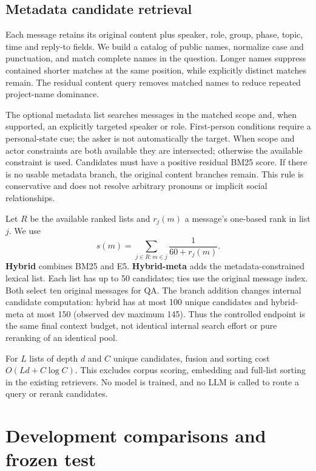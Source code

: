 \documentclass[10pt,a4paper]{article}
\begin{document}
\subsection{Metadata candidate retrieval}
Each message retains its original content plus speaker, role, group, phase, topic, time and reply-to fields. We build a catalog of public names, normalize case and punctuation, and match complete names in the question. Longer names suppress contained shorter matches at the same position, while explicitly distinct matches remain. The residual content query removes matched names to reduce repeated project-name dominance.

The optional metadata list searches messages in the matched scope and, when supported, an explicitly targeted speaker or role. First-person conditions require a personal-state cue; the asker is not automatically the target. When scope and actor constraints are both available they are intersected; otherwise the available constraint is used. Candidates must have a positive residual BM25 score. If there is no usable metadata branch, the original content branches remain. This rule is conservative and does not resolve arbitrary pronouns or implicit social relationships.

Let $R$ be the available ranked lists and $r_j(m)$ a message's one-based rank in list $j$. We use
\begin{equation}
s(m)=\sum_{j\in R:m\in j}\frac{1}{60+r_j(m)}.
\label{eq:rrf}
\end{equation}
\textbf{Hybrid} combines BM25 and E5. \textbf{Hybrid-meta} adds the metadata-constrained lexical list. Each list has up to 50 candidates; ties use the original message index. Both select ten original messages for QA. The branch addition changes internal candidate computation: hybrid has at most 100 unique candidates and hybrid-meta at most 150 (observed dev maximum 145). Thus the controlled endpoint is the same final context budget, not identical internal search effort or pure reranking of an identical pool.

For $L$ lists of depth $d$ and $C$ unique candidates, fusion and sorting cost $O(Ld+C\log C)$. This excludes corpus scoring, embedding and full-list sorting in the existing retrievers. No model is trained, and no LLM is called to route a query or rerank candidates.

\section{Development comparisons and frozen test}
\end{document}
